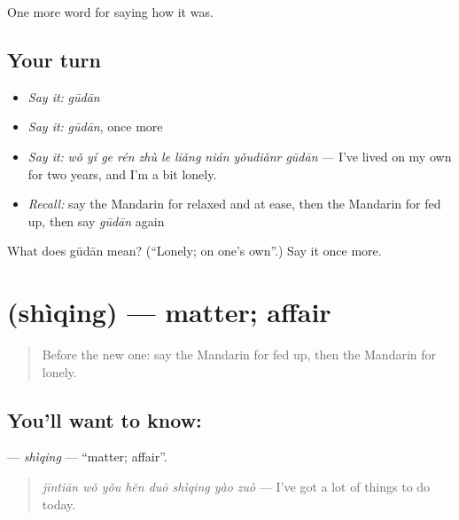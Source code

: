 \begin{grammarlens}[title={What you've built}]
One more word for saying how it was.
\end{grammarlens}

\subsection*{Your turn}
\begin{itemize}
\raggedright
  \item \emph{Say it:} \emph{gūdān}
  \item \emph{Say it:} \emph{gūdān}, once more
  \item \emph{Say it:} \emph{wǒ yí ge rén zhù le liǎng nián yǒudiǎnr gūdān} — I've lived on my own for two years, and I'm a bit lonely.
  \item \emph{Recall:} say the Mandarin for relaxed and at ease, then the Mandarin for fed up, then say \emph{gūdān} again
\end{itemize}

\begin{tcolorbox}[breakable,colback=teal!4,colframe=teal!35!black,title={Before you move on}]
What does gūdān mean? (\textquotedblleft{}Lonely; on one's own\textquotedblright{}.) Say it once more.
\end{tcolorbox}
\section[\texorpdfstring{\zh{事情} (shìqing)}{事情 (shìqing)}]{ (shìqing) — matter; affair}

\label{lesson:ZH-C459-shiqing}



\begin{quote}
Before the new one: say the Mandarin for fed up, then the Mandarin for lonely.
\end{quote}

\subsection*{You'll want to know: }
\textbf{} — \emph{shìqing} — \textquotedblleft{}matter; affair\textquotedblright{}.

\begin{quote}
\textbf{} \emph{jīntiān wǒ yǒu hěn duō shìqing yào zuò} — I've got a lot of things to do today.
\end{quote}

